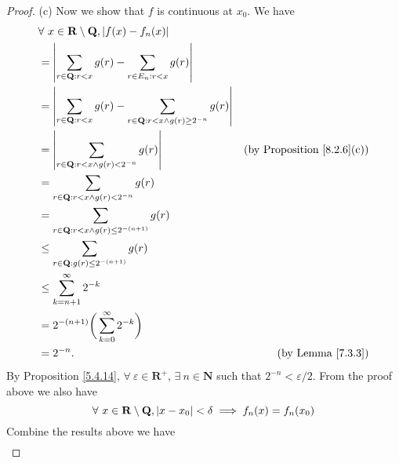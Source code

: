\begin{proof}{(c)}
    Now we show that \(f\) is continuous at \(x_0\).
    We have
    \begin{align*}
         & \forall\ x \in \mathbf{R} \setminus \mathbf{Q}, \abs*{f(x) - f_n(x)}                                                                                 \\
         & = \abs*{\sum_{r \in \mathbf{Q} : r < x} g(r) - \sum_{r \in E_n : r < x} g(r)}                                                                        \\
         & = \abs*{\sum_{r \in \mathbf{Q} : r < x} g(r) - \sum_{r \in \mathbf{Q} : r < x \land g(r) \geq 2^{-n}} g(r)}                                          \\
         & = \abs*{\sum_{r \in \mathbf{Q} : r < x \land g(r) < 2^{-n}} g(r)}                                           & \text{(by Proposition \ref{8.2.6}(c))} \\
         & = \sum_{r \in \mathbf{Q} : r < x \land g(r) < 2^{-n}} g(r)                                                                                           \\
         & = \sum_{r \in \mathbf{Q} : r < x \land g(r) \leq 2^{-(n + 1)}} g(r)                                                                                  \\
         & \leq \sum_{r \in \mathbf{Q} : g(r) \leq 2^{-(n + 1)}} g(r)                                                                                           \\
         & \leq \sum_{k = n + 1}^\infty 2^{-k}                                                                                                                  \\
         & = 2^{-(n + 1)} \bigg(\sum_{k = 0}^\infty 2^{-k}\bigg)                                                                                                \\
         & = 2^{-n}.                                                                                                   & \text{(by Lemma \ref{7.3.3})}
    \end{align*}
    By Proposition \ref{5.4.14}, \(\forall\ \varepsilon \in \mathbf{R}^+\), \(\exists\ n \in \mathbf{N}\) such that \(2^{-n} < \varepsilon / 2\).
    From the proof above we also have
    \[
        \forall\ x \in \mathbf{R} \setminus \mathbf{Q}, \abs*{x - x_0} < \delta \implies f_n(x) = f_n(x_0) \\
    \]
    Combine the results above we have
    \begin{align*}

\end{align*}
\end{proof}
